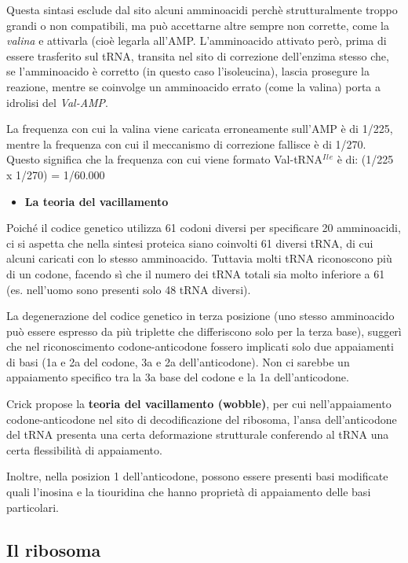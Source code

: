 \documentclass[11pt]{book}
\begin{document}
Questa sintasi esclude dal sito alcuni amminoacidi perchè
strutturalmente troppo grandi o non compatibili, ma può accettarne altre
sempre non corrette, come la \emph{valina} e attivarla (cioè legarla
all'AMP. L'amminoacido attivato però, prima di essere trasferito sul
tRNA, transita nel sito di correzione dell'enzima stesso che, se
l'amminoacido è corretto (in questo caso l'isoleucina), lascia prosegure
la reazione, mentre se coinvolge un amminoacido errato (come la valina)
porta a idrolisi del \emph{Val-AMP}.

La frequenza con cui la valina viene caricata erroneamente sull'AMP è di
1/225, mentre la frequenza con cui il meccanismo di correzione fallisce
è di 1/270. Questo significa che la frequenza con cui viene formato
Val-tRNA\(^I\)\(^l\)\(^e\) è di: (1/225 x 1/270) = 1/60.000

\begin{itemize}
\itemsep1pt\parskip0pt
\item
  \textbf{La teoria del vacillamento}
\end{itemize}

Poiché il codice genetico utilizza 61 codoni diversi per specificare 20
amminoacidi, ci si aspetta che nella sintesi proteica siano coinvolti 61
diversi tRNA, di cui alcuni caricati con lo stesso amminoacido. Tuttavia
molti tRNA riconoscono più di un codone, facendo sì che il numero dei
tRNA totali sia molto inferiore a 61 (es. nell'uomo sono presenti solo
48 tRNA diversi).

La degenerazione del codice genetico in terza posizione (uno stesso
amminoacido può essere espresso da più triplette che differiscono solo
per la terza base), suggerì che nel riconoscimento codone-anticodone
fossero implicati solo due appaiamenti di basi (1a e 2a del codone, 3a e
2a dell'anticodone). Non ci sarebbe un appaiamento specifico tra la 3a
base del codone e la 1a dell'anticodone.

Crick propose la \textbf{teoria del vacillamento (wobble)}, per cui
nell'appaiamento codone-anticodone nel sito di decodificazione del
ribosoma, l'ansa dell'anticodone del tRNA presenta una certa
deformazione strutturale conferendo al tRNA una certa flessibilità di
appaiamento.

Inoltre, nella posizion 1 dell'anticodone, possono essere presenti basi
modificate quali l'inosina e la tiouridina che hanno proprietà di
appaiamento delle basi particolari.

\subsection{Il ribosoma}\label{il-ribosoma}
\end{document}
